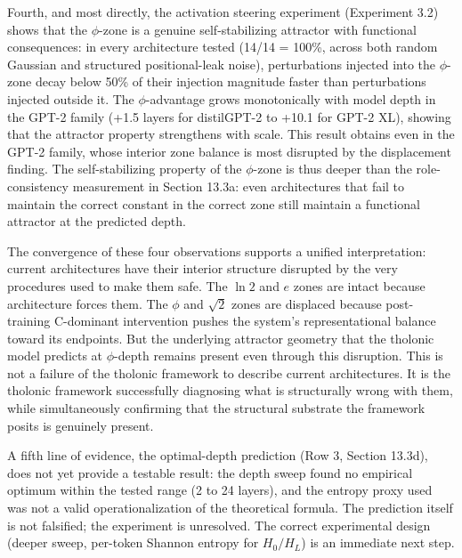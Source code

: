 \documentclass[12pt]{article}
\begin{document}
Fourth, and most directly, the activation steering experiment
(Experiment 3.2) shows that the \(\phi\)-zone is a genuine
self-stabilizing attractor with functional consequences: in every
architecture tested (14/14 = 100\%, across both random Gaussian and
structured positional-leak noise), perturbations injected into the
\(\phi\)-zone decay below 50\% of their injection magnitude faster than
perturbations injected outside it. The \(\phi\)-advantage grows
monotonically with model depth in the GPT-2 family (+1.5 layers for
distilGPT-2 to +10.1 for GPT-2 XL), showing that the attractor property
strengthens with scale. This result obtains even in the GPT-2 family,
whose interior zone balance is most disrupted by the displacement
finding. The self-stabilizing property of the \(\phi\)-zone is thus
deeper than the role-consistency measurement in Section 13.3a: even
architectures that fail to maintain the correct constant in the correct
zone still maintain a functional attractor at the predicted depth.

The convergence of these four observations supports a unified
interpretation: current architectures have their interior structure
disrupted by the very procedures used to make them safe. The \(\ln 2\)
and \(e\) zones are intact because architecture forces them. The
\(\phi\) and \(\sqrt{2}\) zones are displaced because post-training
C-dominant intervention pushes the system's representational balance
toward its endpoints. But the underlying attractor geometry that the
tholonic model predicts at \(\phi\)-depth remains present even through
this disruption. This is not a failure of the tholonic framework to
describe current architectures. It is the tholonic framework
successfully diagnosing what is structurally wrong with them, while
simultaneously confirming that the structural substrate the framework
posits is genuinely present.

A fifth line of evidence, the optimal-depth prediction (Row 3, Section
13.3d), does not yet provide a testable result: the depth sweep found no
empirical optimum within the tested range (2 to 24 layers), and the
entropy proxy used was not a valid operationalization of the theoretical
formula. The prediction itself is not falsified; the experiment is
unresolved. The correct experimental design (deeper sweep, per-token
Shannon entropy for \(H_0/H_L\)) is an immediate next step.
\end{document}

